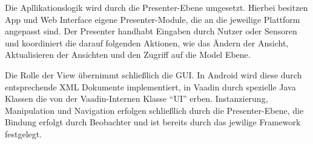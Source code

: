 Die Apllikationslogik wird durch die Presenter-Ebene umgesetzt. Hierbei besitzen App und Web Interface eigene Presenter-Module, die an die jeweilige Plattform angepasst sind. Der Presenter handhabt Eingaben durch Nutzer oder Sensoren und koordiniert die darauf folgenden Aktionen, wie das Ändern der Ansicht, Aktualisieren der Ansichten und den Zugriff auf die Model Ebene.\linebreak\par 

Die Rolle der View übernimmt schließlich die GUI. In Android wird diese durch entsprechende XML Dokumente implementiert, in Vaadin durch spezielle Java Klassen die von der Vaadin-Internen Klasse ``UI'' erben. Instanzierung, Manipulation und Navigation erfolgen schließlich durch die Presenter-Ebene, die Bindung erfolgt durch Beobachter und ist bereits durch das jewilige Framework festgelegt.

